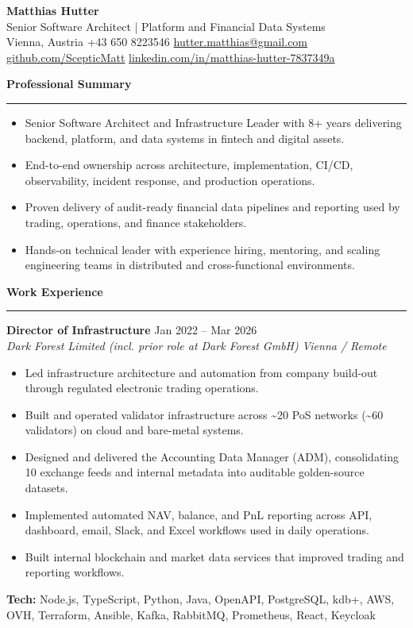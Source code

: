 \documentclass[11pt,a4paper]{article}
\makeatletter
\newcommand{\sectionspacebefore}{1.05em}
\newcommand{\sectionspacetoline}{-0.12em}
\newcommand{\sectionspacetocontent}{0.58em}
\newcommand{\cvsection}[1]{
  \par\vspace{\sectionspacebefore}
  {\large\bfseries\color{black}#1}\par
  \vspace{\sectionspacetoline}
  \noindent\rule{\textwidth}{0.45pt}\par
  \vspace{\sectionspacetocontent}
}
\newcommand{\cvname}{Matthias Hutter}
\newcommand{\cvtitle}{Senior Software Architect | Platform and Financial Data Systems}
\newcommand{\cvlocation}{Vienna, Austria}
\newcommand{\cvphone}{+43 650 8223546}
\newcommand{\cvemail}{hutter.matthias@gmail.com}
\newcommand{\cvgithub}{github.com/ScepticMatt}
\newcommand{\cvlinkedin}{linkedin.com/in/matthias-hutter-7837349a}
\newcommand{\role}[4]{
  \textbf{#1} \hfill #2\\
  \textit{#3} \hfill \textit{#4}
  \vspace{0.25em}
}
\makeatother
\begin{document}
{\LARGE\textbf{\cvname}}\\[0.15em]
{\large\cvtitle}\\[0.45em]
{\small \cvlocation{} \textbar{} \cvphone{} \textbar{} \href{mailto:\cvemail}{\cvemail}}\\
{\small \href{https://\cvgithub}{\cvgithub} \textbar{} \href{https://\cvlinkedin}{\cvlinkedin}}

\cvsection{Professional Summary}
\begin{itemize}
  \item Senior Software Architect and Infrastructure Leader with 8+ years delivering backend, platform, and data systems in fintech and digital assets.
  \item End-to-end ownership across architecture, implementation, CI/CD, observability, incident response, and production operations.
  \item Proven delivery of audit-ready financial data pipelines and reporting used by trading, operations, and finance stakeholders.
  \item Hands-on technical leader with experience hiring, mentoring, and scaling engineering teams in distributed and cross-functional environments.
\end{itemize}

\cvsection{Work Experience}
\role{Director of Infrastructure}{Jan 2022 -- Mar 2026}{Dark Forest Limited (incl. prior role at Dark Forest GmbH)}{Vienna / Remote}
\begin{itemize}
  \item Led infrastructure architecture and automation from company build-out through regulated electronic trading operations.
  \item Built and operated validator infrastructure across \textasciitilde20 PoS networks (\textasciitilde60 validators) on cloud and bare-metal systems.
  \item Designed and delivered the Accounting Data Manager (ADM), consolidating 10 exchange feeds and internal metadata into auditable golden-source datasets.
  \item Implemented automated NAV, balance, and PnL reporting across API, dashboard, email, Slack, and Excel workflows used in daily operations.
  \item Built internal blockchain and market data services that improved trading and reporting workflows.
\end{itemize}
\textbf{Tech:} Node.js, TypeScript, Python, Java, OpenAPI, PostgreSQL, kdb+, AWS, OVH, Terraform, Ansible, Kafka, RabbitMQ, Prometheus, React, Keycloak
\end{document}
